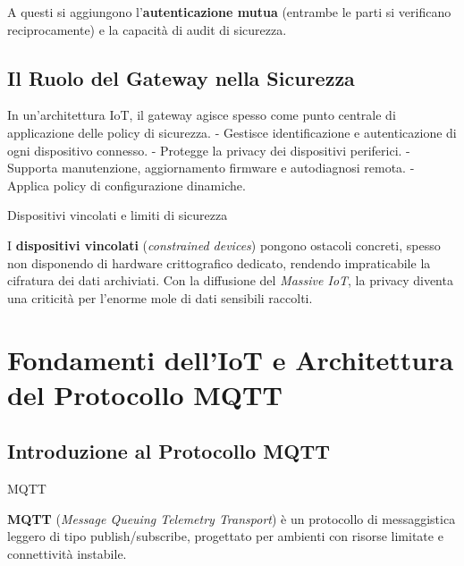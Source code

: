 \documentclass[
  italian,
  openany]{book}
\begin{document}
A questi si aggiungono l'\textbf{autenticazione mutua} (entrambe le
parti si verificano reciprocamente) e la capacità di audit di sicurezza.

\section{Il Ruolo del Gateway nella
Sicurezza}\label{il-ruolo-del-gateway-nella-sicurezza}

In un'architettura IoT, il gateway agisce spesso come punto centrale di
applicazione delle policy di sicurezza. - Gestisce identificazione e
autenticazione di ogni dispositivo connesso. - Protegge la privacy dei
dispositivi periferici. - Supporta manutenzione, aggiornamento firmware
e autodiagnosi remota. - Applica policy di configurazione dinamiche.

\begin{calloutwarning}{Dispositivi vincolati e limiti di sicurezza}

I \textbf{dispositivi vincolati} (\emph{constrained devices}) pongono
ostacoli concreti, spesso non disponendo di hardware crittografico
dedicato, rendendo impraticabile la cifratura dei dati archiviati. Con
la diffusione del \emph{Massive IoT}, la privacy diventa una criticità
per l'enorme mole di dati sensibili raccolti.

\end{calloutwarning}

\newpage

\chapter{Fondamenti dell'IoT e Architettura del Protocollo
MQTT}\label{fondamenti-delliot-e-architettura-del-protocollo-mqtt}

\section{Introduzione al Protocollo
MQTT}\label{introduzione-al-protocollo-mqtt}

\begin{calloutdefinition}{MQTT}

\textbf{MQTT} (\emph{Message Queuing Telemetry Transport}) è un
protocollo di messaggistica leggero di tipo publish/subscribe,
progettato per ambienti con risorse limitate e connettività instabile.

\end{calloutdefinition}
\end{document}

